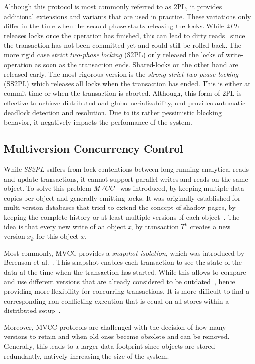 Although this protocol is most commonly referred to as 2PL, it provides additional extensions and variants that are used in practice. 
These variations only differ in the time when the second phase starts releasing the locks. 
While \emph{2PL} releases locks once the operation has finished, this can lead to dirty 
reads~\cite{weikum:2001} since the transaction has not been committed yet and could still be rolled back.
The more rigid case \emph{strict two-phase locking} (S2PL) only released the locks of write-operation as soon as the transaction ends.
Shared-locks on the other hand are released early.
The most rigorous version is the \emph{strong strict two-phase locking} (SS2PL) which releases all locks when the transaction has ended.
This is either at commit time or when the transaction is aborted.
Although, this form of 2PL is effective to achieve distributed and global serializability, and provides automatic deadlock detection and resolution.
Due to its rather pessimistic blocking behavior, it negatively impacts the performance of the system.



\subsection{Multiversion Concurrency Control}
While \emph{SS2PL} suffers from lock contentions between long-running analytical reads and update transactions, it cannot support parallel writes and reads on the same object. 
To solve this problem \emph{MVCC}~\cite{bernstein:1981} was introduced, by keeping multiple data copies per object and generally omitting locks.
It was originally established for multi-version databases that tried to extend the concept of shadow pages, by keeping the complete history or at least multiple versions 
of each object~\cite{bernstein:1982, bernstein:1983}.
The idea is that every new write of an object \emph{x}, by transaction $T^k$ creates a new version $x_k$ for this object $x$.

Most commonly, MVCC provides a \emph{snapshot isolation}, which was introduced by Berenson et al.~\cite{berenson:1995}.
This snapshot enables each transaction to see the state of the data at the time when the transaction has started.
While this allows to compare and use different versions that are already considered to be outdated~\cite{faleiro:2015}, 
hence providing more flexibility for concurring transactions. It is more difficult to find a corresponding non-conflicting 
execution that is equal on all stores within a distributed setup~\cite{fekete:2005, daudjee:2006}.

Moreover, MVCC protocols are challenged with the decision of how many versions to retain and when old ones become obsolete and can be removed. 
Generally, this leads to a larger data footprint since objects are stored redundantly, natively increasing the size of the system. 
